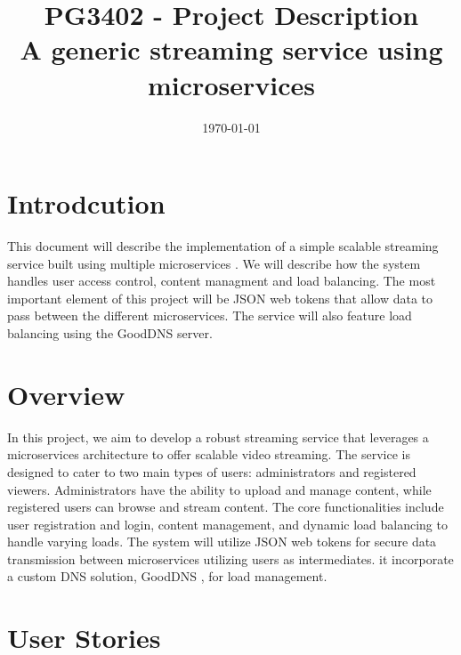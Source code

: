 \documentclass[12pt]{article}
\title{\textbf{PG3402 - Project Description} \\ A generic streaming service using microservices}
\date{\today}
\begin{document}
\subsectionfont{\fontsize{12}{14}\selectfont}

\maketitle

\pagebreak

\tableofcontents



\section{Introdcution}
This document will describe the implementation of a 
simple scalable streaming service built using multiple microservices \cite{Microservices2024}.
We will describe how the system handles user access control, content managment and load balancing.
The most important element of this project will be JSON web tokens\cite{jonesJSONWebToken2015} 
that allow data to pass between the different microservices. 
The service will also feature load balancing using the GoodDNS server\cite{heimonenSlenderman00GoodDns2023}.

\section{Overview} 
In this project, we aim to develop a robust streaming service that leverages a microservices architecture to offer 
scalable video streaming. The service is designed to cater to two main types of users: 
administrators and registered viewers. Administrators have the ability to upload and manage content, 
while registered users can browse and stream content.
The core functionalities include user registration and login, 
content management, and dynamic load balancing to handle varying loads. 
The system will utilize JSON web tokens for secure data transmission between 
microservices utilizing users as intermediates. 
it incorporate a custom DNS solution, 
GoodDNS \cite{heimonenSlenderman00GoodDns2023}, for load management.



\section{User Stories}
\end{document}
